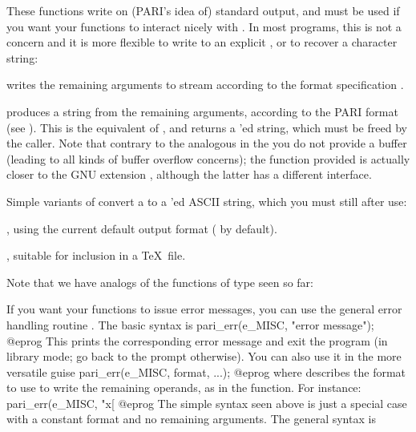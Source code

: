 These functions write on (PARI's idea of) standard output, and must be used
if you want your functions to interact nicely with . In most
programs, this is not a concern and it is more flexible to write to an
explicit , or to recover a character string:

 writes the
remaining arguments to stream  according to the format
specification .

 produces a string from the
remaining arguments, according to the PARI format  (see ).
This is the  equivalent of , and returns a
'ed string, which must be freed by the caller. Note that contrary
to the analogous  in the  you do not provide a buffer
(leading to all kinds of buffer overflow concerns); the function provided is
actually closer to the GNU extension , although the latter has
a different interface.

Simple variants of  convert a  to a
'ed ASCII string, which you must still  after use:

, using the current default output format
( by default).

, suitable for inclusion in a \TeX\ file.


Note that we have  analogs of the functions of  type
seen so far:





\noindent
If you want your functions to issue error messages, you can use the general
error handling routine . The basic syntax is
%
\bprog
  pari_err(e_MISC, "error message");
@eprog\noindent
This prints the corresponding error message and exit the program (in
library mode; go back to the  prompt otherwise).\label{se:err} You can
also use it in the more versatile guise
\bprog
  pari_err(e_MISC, format, ...);
@eprog\noindent
where  describes the format to use to write the remaining
operands, as in the  function. For instance:
\bprog
  pari_err(e_MISC, "x[%
@eprog\noindent
The simple syntax seen above is just a special case with a constant format
and no remaining arguments. The general syntax is

